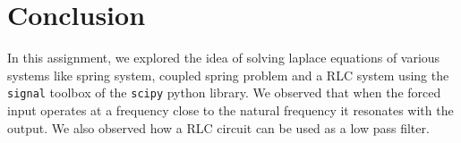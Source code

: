 \documentclass[12pt, a4paper]{report}
\begin{document}
\section*{Conclusion}
In this assignment, we explored the idea of solving laplace equations of various systems like spring system, coupled spring problem and a RLC system using the \texttt{signal} toolbox of the \texttt{scipy} python library. We observed that when the forced input operates at a frequency close to the natural frequency it resonates with the output. We also observed how a RLC circuit can be used as a low pass filter.
\end{document}
